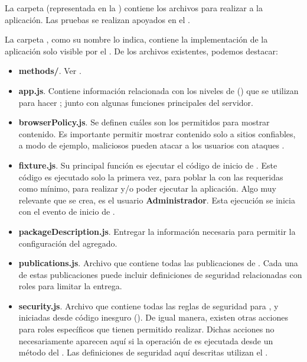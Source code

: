 

La carpeta \folderTests (representada en la ) contiene los archivos para realizar \testingCPT a la aplicación. Las pruebas se realizan apoyados en el \packageAS \sanjoJasminePackage.



La carpeta \serverFolder, como su nombre lo indica, contiene la implementación de la aplicación solo visible por el \serverSideAS. De los archivos existentes, podemos destacar:

\begin{itemize}
	\item
	 	\textbf{methods/}. Ver .
	\item
	 	\textbf{app.js}. Contiene información relacionada con los niveles de \bunyanNAME (\packageAS \bunyanPackage) que se utilizan para hacer \loggingCPT; junto con algunas funciones principales del servidor.
	\item
		\textbf{browserPolicy.js}. Se definen cuáles son los \websitesINT permitidos para mostrar contenido. Es importante permitir mostrar contenido solo a sitios confiables, a modo de ejemplo, \websitesINT maliciosos pueden atacar a los usuarios con ataques \clickjackingINT.
 	\item
	 	\textbf{fixture.js}. Su principal función es ejecutar el código de inicio de \fixturesPC. Este código es ejecutado solo la primera vez, para poblar la \dataBasesDB con las \collectionsMETEOR requeridas como mínimo, para realizar \testingCPT y/o poder ejecutar la aplicación. Algo muy relevante que se crea, es el usuario \textbf{Administrador}.  Esta ejecución se inicia con el evento de inicio de \meteorNAME.
	\item
		\textbf{packageDescription.js}. Entregar la información necesaria para permitir la configuración del \packageAS agregado.
	\item
		\textbf{publications.js}. Archivo que contiene todas las publicaciones de \documentsDB. Cada una de estas publicaciones puede incluir definiciones de seguridad relacionadas con roles para limitar la entrega.
	\item
	 	\textbf{security.js}. Archivo que contiene todas las reglas de seguridad para \insertsDB, \updatesDB y \removesDB iniciadas desde código inesguro (\clientsAS). De igual manera, existen otras acciones para roles específicos que tienen permitido realizar. Dichas acciones no necesariamente aparecen aquí si la operación de \dataBasesDB es ejecutada desde un método del \serverAS. Las definiciones de seguridad aquí descritas utilizan el \packageAS \securityPackage.
\end{itemize}


